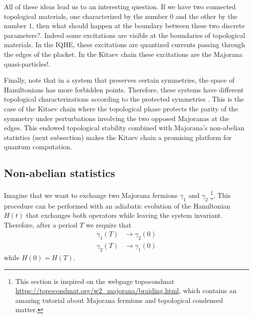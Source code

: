 All of these ideas lead us to an interesting question. If we have two connected topological materials, one characterized by the  number $0$ and the other by the number $1$, then what should happen at the boundary between these two discrete parameters?. Indeed some excitations are visible at the boundaries of topological materials. In the IQHE, these excitations are quantized currents passing through the edges of the placket. In the Kitaev chain  these excitations are the Majorana quasi-particles!. 

Finally,  note that in a system that preserves certain symmetries, the space of Hamiltonians has more forbidden points. Therefore, these systems have  different topological characterizations according to the protected symmetries \cite{ryu_topological_2010}.  This is the case of the Kitaev chain where the topological phase  protects the parity of the symmetry under perturbations involving the two opposed Majoranas at the edges. This endowed topological stability combined with Majorana's non-abelian statistics (next subsection) makes the Kitaev chain a promising platform for quantum computation. 





\subsection{Non-abelian statistics  \label{subsec:non-ab}}




Imagine that we want to exchange two Majorana fermions $\gamma_1$ and $\gamma_2$ \footnote{This section is inspired on the webpage topocondmat \url{https://topocondmat.org/w2_majorana/braiding.html}, which contains an amazing tutorial about Majorana fermions and topological condensed matter. }. This procedure can be performed with an adiabatic evolution of the Hamiltonian $H(t)$ that exchanges both operators while leaving the system invariant. Therefore, after a period $T$ we require that 
\begin{equation}
\begin{aligned}
\gamma_1(T) &\rightarrow \gamma_2(0) \\
\gamma_2(T) &\rightarrow  \gamma_1(0) 
\end{aligned}
\label{eq:exchange}
\end{equation}
while  $H(0)=H(T)$. 


